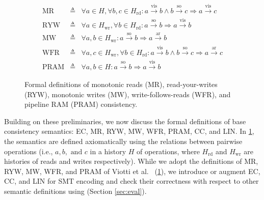   \begin{figure}
  \begin{minipage}{3.5in}
    \begin{eqnarray*}
	    \text{MR} & \triangleq & \forall a \in H, \forall b, c \in H_\text{rd}: a
	    \xrightarrow{\text{vis}} b \land b \xrightarrow{\text{so}} c \Rightarrow
	    a \xrightarrow{\text{vis}} c
      \\
      \text{RYW} & \triangleq & \forall a \in H_\text{wr}, \forall b \in
      H_\text{rd}: a \xrightarrow{\text{so}} b \Rightarrow a
      \xrightarrow{\text{vis}} b
      \\
      \text{MW} & \triangleq & \forall a, b \in H_\text{wr}: a
      \xrightarrow{\text{so}} b \Rightarrow a \xrightarrow{\text{ar}} b
      \\
      \text{WFR} & \triangleq & \forall a, c \in H_\text{wr}, \forall b \in
      H_\text{rd}: a \xrightarrow{\text{vis}} b \land b
      \xrightarrow{\text{so}} c \Rightarrow a \xrightarrow{\text{ar}} c
      \\
      \text{PRAM} & \triangleq & \forall a, b \in H: a \xrightarrow{\text{so}}
      b \Rightarrow a \xrightarrow{\text{vis}} b
    \end{eqnarray*}
	  \end{minipage}
    \caption{Formal definitions of monotonic reads (MR), read-your-writes
      (RYW), monotonic writes (MW), write-follows-reads (WFR), and pipeline
    RAM (PRAM) consistency.}\label{fig:semdef}
  \end{figure}
Building on these preliminaries, we now discuss the formal definitions of
base consistency semantics: EC, MR, RYW, MW, WFR, PRAM, CC, and LIN. In
\cref{fig:semdef}, the semantics are defined axiomatically using the relations between
pairwise operations (i.e., $a, b, \textrm{ and } c$ in a history $H$ of
  operations, where $H_\text{rd}$ and $H_\text{wr}$ are histories of reads and
	  writes respectively).
  While we adopt the definitions of MR, RYW, MW, WFR,
  and PRAM of Viotti et al.~\cite{viotti2016consistency} (\cref{fig:semdef}),
  we introduce or augment EC, CC, and LIN for SMT encoding and
  check their correctness with respect to other semantic definitions
  using \sysname{}
  (Section \ref{sec:eval}).

